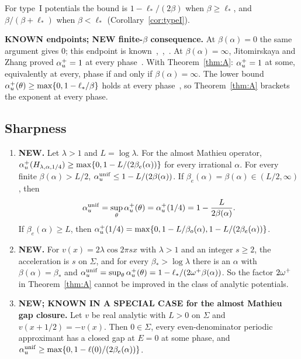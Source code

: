 For type~I potentials the bound is $1-\ell_*/(2\beta)$ when $\beta\ge\ell_*$, and $\beta/(\beta+\ell_*)$ when $\beta<\ell_*$ (Corollary~\ref{cor:typeI}).

\begin{remark}\label{rem:A}
\textbf{KNOWN endpoints; NEW finite-$\beta$ consequence.} At $\beta(\alpha)=0$ the same argument gives $0$; this endpoint is known~\cite{DT2007},~\cite[Remark~1.12]{JitomirskayaMavi2017},~\cite[Corollary~5.10]{DMuniv}. At $\beta(\alpha)=\infty$, Jitomirskaya and Zhang proved $\alpha_u^+=1$ at every phase~\cite[Theorem~3(2)]{JZ2022}. With Theorem~\ref{thm:A}: $\alpha_u^+=1$ at some, equivalently at every, phase if and only if $\beta(\alpha)=\infty$. The lower bound $\alpha_u^+(\theta)\ge\max\{0,1-\ell_*/\beta\}$ holds at every phase~\cite[Theorem~4.1]{DMuniv}, so Theorem~\ref{thm:A} brackets the exponent at every phase.
\end{remark}

\subsection{Sharpness}

\begin{maintheorem}[Sharpness]\label{thm:B}
\begin{enumerate}
\item \textbf{NEW.} Let $\lambda>1$ and $L=\log\lambda$. For the almost Mathieu operator, $\alpha_u^+(H_{\lambda,\alpha,1/4})\ge\max\{0,1-L/(2\beta_e(\alpha))\}$ for every irrational $\alpha$. For every finite $\beta(\alpha)>L/2$, $\alpha_u^{\mathrm{unif}}\le1-L/(2\beta(\alpha))$. If $\beta_e(\alpha)=\beta(\alpha)\in(L/2,\infty)$, then
\[
\alpha_u^{\mathrm{unif}}=\sup_\theta\alpha_u^+(\theta)=\alpha_u^+(1/4)=1-\frac{L}{2\beta(\alpha)} .
\]
If $\beta_e(\alpha)\ge L$, then $\alpha_u^+(1/4)=\max\{0,1-L/\beta_o(\alpha),1-L/(2\beta_e(\alpha))\}$.
\item \textbf{NEW.} For $v(x)=2\lambda\cos2\pi sx$ with $\lambda>1$ and an integer $s\ge2$, the acceleration is $s$ on $\Sigma$, and for every $\beta_*>\log\lambda$ there is an $\alpha$ with $\beta(\alpha)=\beta_*$ and $\alpha_u^{\mathrm{unif}}=\sup_\theta\alpha_u^+(\theta)=1-\ell_*/(2\omega^+\beta(\alpha))$. So the factor $2\omega^+$ in Theorem~\ref{thm:A} cannot be improved in the class of analytic potentials.
\item \textbf{NEW; KNOWN IN A SPECIAL CASE for the almost Mathieu gap closure.} Let $v$ be real analytic with $L>0$ on $\Sigma$ and $v(x+1/2)=-v(x)$. Then $0\in\Sigma$, every even-denominator periodic approximant has a closed gap at $E=0$ at some phase, and $\alpha_u^{\mathrm{unif}}\ge\max\{0,1-\ell(0)/(2\beta_e(\alpha))\}$.
\end{enumerate}
\end{maintheorem}

